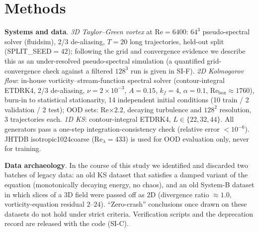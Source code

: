 \documentclass[11pt,a4paper]{article}
\begin{document}
\section{Methods}

\textbf{Systems and data}. \emph{3D Taylor--Green vortex\cite{taylor1937}} at Re$=6400$: $64^3$ pseudo-spectral solver (fluidsim\cite{mohanan2019fluidsim}), 2/3 de-aliasing, $T{=}20$ long trajectories, held-out split (SPLIT\_SEED$=42$); following the grid and convergence evidence we describe this as an under-resolved pseudo-spectral simulation (a quantified grid-convergence check against a filtered $128^3$ run is given in SI-F). \emph{2D Kolmogorov flow}: in-house vorticity--stream-function spectral solver (contour-integral ETDRK4\cite{cox2002etdrk4,kassam2005}, 2/3 de-aliasing, $\nu{=}2{\times}10^{-3}$, $A{=}0.15$, $k_f{=}4$, $\alpha{=}0.1$, $\mathrm{Re}_{\mathrm{box}}{\approx}1760$), burn-in to statistical stationarity, 14 independent initial conditions (10 train / 2 validation / 2 test); OOD sets: Re$\times2.2$, decaying turbulence and $128^2$ resolution, 3 trajectories each. \emph{1D KS}\cite{kuramoto1976,sivashinsky1977}: contour-integral ETDRK4, $L\in\{22,32,44\}$. All generators pass a one-step integration-consistency check (relative error $<10^{-6}$). JHTDB isotropic1024coarse\cite{li2008jhtdb} ($\mathrm{Re}_\lambda{=}433$) is used for OOD evaluation only, never for training.

\textbf{Data archaeology}. In the course of this study we identified and discarded two batches of legacy data: an old KS dataset that satisfies a damped variant of the equation (monotonically decaying energy, no chaos), and an old System-B dataset in which slices of a 3D field were passed off as 2D (divergence ratio $\approx1.0$, vorticity-equation residual $2$--$24$). ``Zero-crash'' conclusions once drawn on these datasets do not hold under strict criteria. Verification scripts and the deprecation record are released with the code (SI-C).
\end{document}
